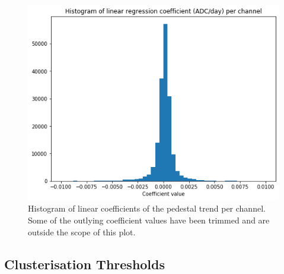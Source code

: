 \begin{figure}
    \centering
    \includegraphics[width=0.7\linewidth]{figures/chapter4/calib_analysis/Part1-pedestal-trend.png}
    \caption{Histogram of linear coefficients of the pedestal trend per channel. Some of the outlying coefficient values have been trimmed and are outside the scope of this plot.}
    \label{plot:part1-pedestal-trend}
\end{figure}

\subsection{Clusterisation Thresholds}

